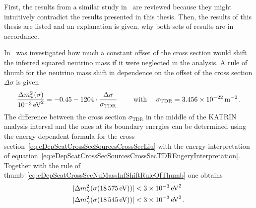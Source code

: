 First, the results from a similar study in~\cite{Groh2015} are reviewed because they might intuitively contradict the results presented in this thesis. Then, the results of this thesis are listed and an explanation is given, why both sets of results are in accordance.

In~\cite{Groh2015} was investigated how much a constant offset of the cross section would shift the inferred squared neutrino mass if it were neglected in the analysis. A rule of thumb for the neutrino mass shift in dependence on the offset of the cross section $\Delta\sigma$ is given~\cite{Groh2015}
\begin{equation}
	\label{eq:eDepScatCrossSecNuMassInfShiftRuleOfThumb}
	\frac{\Delta m_\upnu^2(\sigma)}{\SI{e-3}{eV^2}} =
	-0.45
	-1204\cdot
	\frac{
		\Delta\sigma
	}{
		\sigma_\mathrm{TDR}
	}
	\qquad \text{ with } \quad 
	\sigma_\mathrm{TDR} = \SI{3.456e-22}{m^{-2}}
	\text{\,.}
\end{equation}
The difference between the cross section $\sigma_\mathrm{TDR}$ in the middle of the KATRIN analysis interval and the ones at its boundary energies can be determined using the energy dependent formula for the cross section~\eqref{eq:eDepScatCrossSecSourcesCrossSecLiu} with the energy interpretation of equation~\eqref{eq:eDepScatCrossSecSourcesCrossSecTDREngeryInterpretation}. Together with the rule of thumb~\eqref{eq:eDepScatCrossSecNuMassInfShiftRuleOfThumb} one obtains
\begin{align*}
	\label{eq:eDepScatCrossSecNuMassInfShiftsByGroh}
	\lvert\Delta m_\upnu^2(\sigma(\SI{18575}{eV}))\rvert &< \SI{3e-3}{eV^2} \\
	\lvert\Delta m_\upnu^2(\sigma(\SI{18545}{eV}))\rvert &< \SI{3e-3}{eV^2} 
	\text{\,.}
\end{align*}

